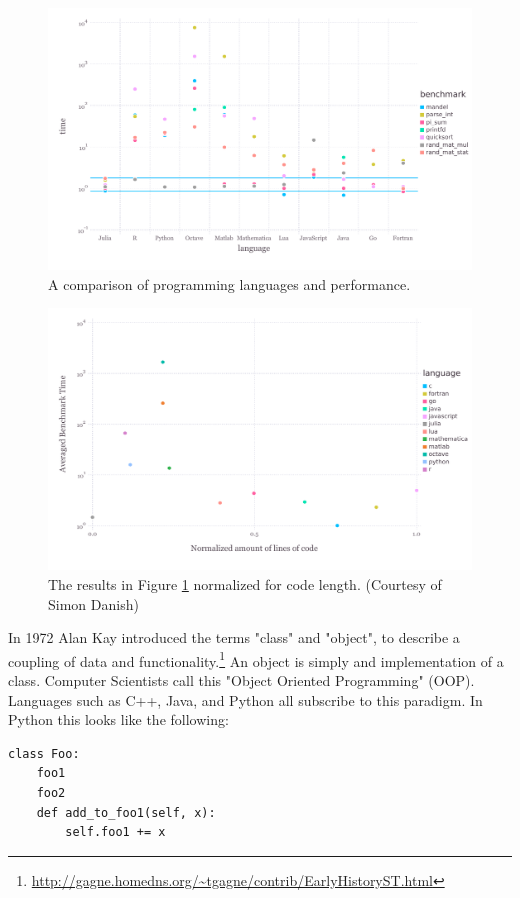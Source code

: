 \documentclass[a4paper]{article}
\begin{document}
\begin{figure}[h!]
  \centering
    \includegraphics[width=1.0\textwidth]{img/juliabench.pdf}
  \caption{A comparison of programming languages and performance.}
  \label{fig:juliabench}
\end{figure}

\begin{figure}[h!]
  \centering
    \includegraphics[width=1.0\textwidth]{img/expressability.pdf}
  \caption{The results in Figure \ref{fig:juliabench} normalized for code length. (Courtesy of Simon Danish)}
  \label{fig:juliaexpr}
\end{figure}


In 1972 Alan Kay introduced the terms
"class" and "object", to describe a coupling of data and functionality.\footnote{\url{http://gagne.homedns.org/~tgagne/contrib/EarlyHistoryST.html}}
An object is simply and implementation of a class. Computer Scientists
call this "Object Oriented Programming" (OOP).
Languages such as C++, Java, and Python all subscribe to this paradigm.
In Python this looks like the following:
\begin{lstlisting}
class Foo:
    foo1
    foo2
    def add_to_foo1(self, x):
        self.foo1 += x
\end{lstlisting}
\end{document}
